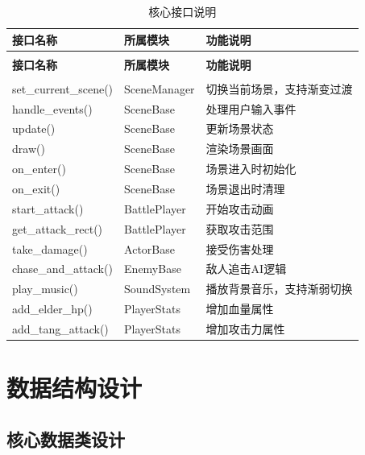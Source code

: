 \documentclass[12pt,a4paper]{article}
\begin{document}
\begin{longtable}{>{\centering\arraybackslash}m{2.5cm}>{\centering\arraybackslash}m{2.5cm}>{\centering\arraybackslash}m{5cm}}
\caption{核心接口说明} \label{tab:interfaces} \\
\toprule
\textbf{接口名称} & \textbf{所属模块} & \textbf{功能说明} \\
\midrule
\endfirsthead

\toprule
\multicolumn{3}{l}{续表} \\
\textbf{接口名称} & \textbf{所属模块} & \textbf{功能说明} \\
\midrule
\endhead

\midrule
\multicolumn{3}{r}{续下页} \\
\endfoot

\bottomrule
\endlastfoot

set\_current\_scene() & SceneManager & 切换当前场景，支持渐变过渡 \\
handle\_events() & SceneBase & 处理用户输入事件 \\
update() & SceneBase & 更新场景状态 \\
draw() & SceneBase & 渲染场景画面 \\
on\_enter() & SceneBase & 场景进入时初始化 \\
on\_exit() & SceneBase & 场景退出时清理 \\
start\_attack() & BattlePlayer & 开始攻击动画 \\
get\_attack\_rect() & BattlePlayer & 获取攻击范围 \\
take\_damage() & ActorBase & 接受伤害处理 \\
chase\_and\_attack() & EnemyBase & 敌人追击AI逻辑 \\
play\_music() & SoundSystem & 播放背景音乐，支持渐弱切换 \\
add\_elder\_hp() & PlayerStats & 增加血量属性 \\
add\_tang\_attack() & PlayerStats & 增加攻击力属性 \\
\end{longtable}

\section{数据结构设计}

\subsection{核心数据类设计}
\end{document}
